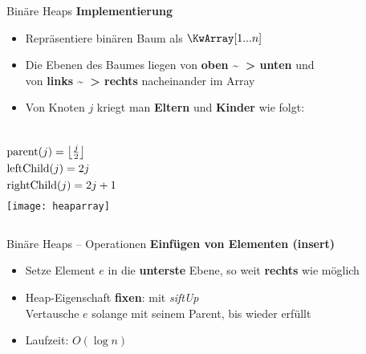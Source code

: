 \begin{frame}{Binäre Heaps}
	\textbf{Implementierung} \\
	\begin{itemize}
		\item Repräsentiere binären Baum als $\KwArray[1...n]$ 
		\item Die Ebenen des Baumes liegen von \textbf{oben \~~> unten} und \\ von \textbf{links \~~> rechts} nacheinander im Array 
		\pause
		\item Von Knoten $j$ kriegt man \textbf{Eltern} und \textbf{Kinder} wie folgt:
	\end{itemize}
	\begin{columns}
			\vspace{-7\baselineskip} %
			\begin{align*}
				&\|parent|(j) = \floor{\tfrac{j}{2}} \\
				&\|leftChild|(j) = 2j \\
				&\|rightChild|(j) = 2j + 1
			\end{align*}
			\texttt{[image: heaparray]}
	\end{columns}
\end{frame}

\begin{frame}{Binäre Heaps – Operationen}
	\textbf{Einfügen von Elementen (insert)} 
	\begin{itemize}
		\item Setze Element $e$ in die \textbf{unterste} Ebene, so weit \textbf{rechts} wie möglich
		\pause
		\item Heap-Eigenschaft \textbf{fixen}: mit \emph{siftUp} \\
		Vertausche $e$ solange mit seinem Parent, bis wieder erfüllt
		\pause
		\item Laufzeit: $O(\log n)$
	\end{itemize}
\end{frame}

